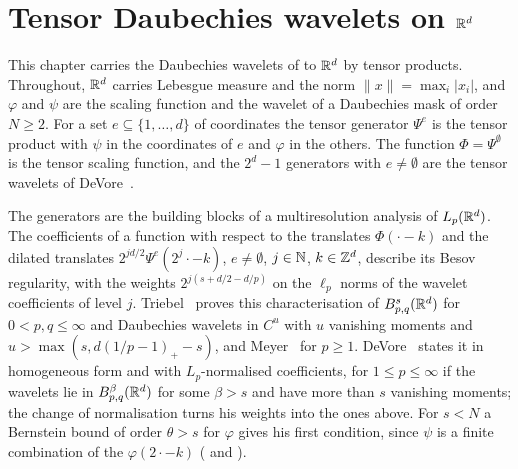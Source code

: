 \chapter{Tensor Daubechies wavelets on \texorpdfstring{$\mathbb{R}^d$}{R\^{}d}}
\label{ch:daubechies-rd}

This chapter carries the Daubechies wavelets of  to $\mathbb{R}^d$ by tensor
products. Throughout, $\mathbb{R}^d$ carries Lebesgue measure and the norm $\|x\| = \max_i |x_i|$, and
$\varphi$ and $\psi$ are the scaling function and the wavelet of a Daubechies mask of order
$N \geq 2$. For a set $e \subseteq \{1, \dots, d\}$ of coordinates the tensor generator $\Psi^e$
is the tensor product with $\psi$ in the coordinates of $e$ and $\varphi$ in the others. The
function $\Phi = \Psi^\emptyset$ is the tensor scaling function, and the $2^d - 1$ generators with
$e \neq \emptyset$ are the tensor wavelets of DeVore~\cite[(7.18)]{DeVore1998}.

The generators are the building blocks of a multiresolution analysis of $L_p(\mathbb{R}^d)$. The
coefficients of a function with respect to the translates $\Phi(\cdot - k)$ and the dilated
translates $2^{jd/2} \Psi^e(2^j \cdot - k)$, $e \neq \emptyset$, $j \in \mathbb{N}$, $k \in \mathbb{Z}^d$,
describe its Besov regularity, with the weights $2^{j(s + d/2 - d/p)}$ on the $\ell_p$ norms of
the wavelet coefficients of level $j$. Triebel~\cite[Theorem~1.20]{Triebel2008} proves this
characterisation of $B^{s}_{p,q}(\mathbb{R}^d)$ for $0 < p, q \leq \infty$ and Daubechies wavelets
in $C^u$ with $u$ vanishing moments and $u > \max(s, d(1/p - 1)_+ - s)$, and
Meyer~\cite[Ch.~6, \S 10]{Meyer} for $p \geq 1$. DeVore~\cite[\S 7.3, (7.28) and
Remark~7.2]{DeVore1998} states it in homogeneous form and with $L_p$-normalised coefficients, for
$1 \leq p \leq \infty$ if the wavelets lie in $B^{\beta}_{p,q}(\mathbb{R}^d)$ for some $\beta > s$
and have more than $s$ vanishing moments; the change of normalisation \cite[(7.25)]{DeVore1998}
turns his weights into the ones above. For $s < N$ a Bernstein bound of order $\theta > s$ for
$\varphi$ gives his first condition, since $\psi$ is a finite combination of the
$\varphi(2 \cdot - k)$ ( and
).

